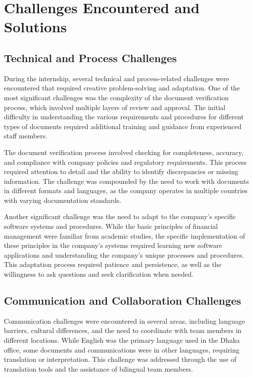 \section{Challenges Encountered and Solutions}

\subsection{Technical and Process Challenges}
During the internship, several technical and process-related challenges were encountered that required creative problem-solving and adaptation. One of the most significant challenges was the complexity of the document verification process, which involved multiple layers of review and approval. The initial difficulty in understanding the various requirements and procedures for different types of documents required additional training and guidance from experienced staff members.

The document verification process involved checking for completeness, accuracy, and compliance with company policies and regulatory requirements. This process required attention to detail and the ability to identify discrepancies or missing information. The challenge was compounded by the need to work with documents in different formats and languages, as the company operates in multiple countries with varying documentation standards.

Another significant challenge was the need to adapt to the company's specific software systems and procedures. While the basic principles of financial management were familiar from academic studies, the specific implementation of these principles in the company's systems required learning new software applications and understanding the company's unique processes and procedures. This adaptation process required patience and persistence, as well as the willingness to ask questions and seek clarification when needed.

\subsection{Communication and Collaboration Challenges}
Communication challenges were encountered in several areas, including language barriers, cultural differences, and the need to coordinate with team members in different locations. While English was the primary language used in the Dhaka office, some documents and communications were in other languages, requiring translation or interpretation. This challenge was addressed through the use of translation tools and the assistance of bilingual team members.

